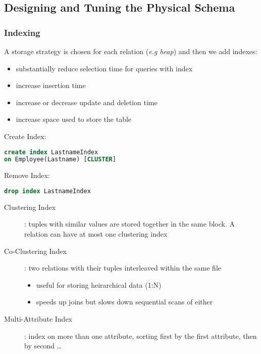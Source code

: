 \documentclass[]{article}
\theoremstyle{definition}
\begin{document}
	\subsection{Designing and Tuning the Physical Schema}
	\subsubsection{Indexing}
	A storage strategy is chosen for each relation (\textit{e.g heap}) and then we add indexes:
	\begin{itemize}
		\item substantially reduce selection time for queries with index
		\item increase insertion time
		\item increase or decrease update and deletion time
		\item increase space used to store the table
	\end{itemize}

	Create Index:
	\begin{lstlisting}[language=SQL]
create index LastnameIndex
on Employee(Lastname) [CLUSTER]
	\end{lstlisting}
	Remove Index:
	\begin{lstlisting}[language=SQL]
drop index LastnameIndex
	\end{lstlisting}

	\begin{description}
		\item[Clustering Index]: tuples with similar values are stored together in the same block. A relation can have at most one clustering index
		\item[Co-Clustering Index]: two relations with their tuples interleaved within the same file
			\begin{itemize}
				\item useful for storing heirarchical data (1:N)
				\item speeds up joins but slows down sequential scans of either
			\end{itemize}
		\item[Multi-Attribute Index]: index on more than one attribute, sorting first by the first attribute, then by second \dots
	\end{description}
\end{document}
